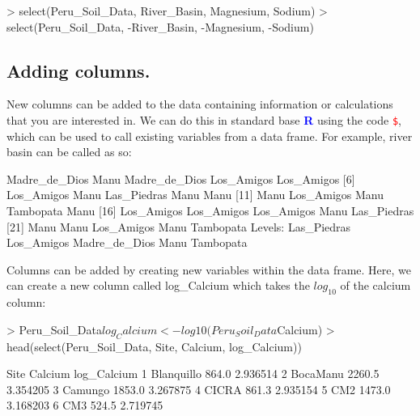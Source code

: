 \documentclass[a4paper,12pt]{article}
\newcommand\boldblue[1]{\textcolor{blue}{\textbf{#1}}}
\newcommand\code[1]{\textcolor{red}{\texttt{#1}}}
\begin{document}
\begin{shaded}
\begin{Schunk}
\begin{Sinput}
> select(Peru_Soil_Data, River_Basin, Magnesium, Sodium)
> select(Peru_Soil_Data, -River_Basin, -Magnesium, -Sodium)
\end{Sinput}
\end{Schunk}
\end{shaded}

\subsection{Adding columns.}

New columns can be added to the data containing information or calculations that you are interested in. We can do this in standard base \boldblue{R} using the code \code{\$}, which can be used to call existing variables from a data frame. For example, river basin can be called as so:

\begin{shaded}
\begin{Schunk}
\begin{Soutput}
 [1] Madre_de_Dios Manu          Madre_de_Dios Los_Amigos    Los_Amigos   
 [6] Los_Amigos    Manu          Las_Piedras   Manu          Manu         
[11] Manu          Los_Amigos    Manu          Tambopata     Manu         
[16] Los_Amigos    Los_Amigos    Los_Amigos    Manu          Las_Piedras  
[21] Manu          Manu          Los_Amigos    Manu          Tambopata    
Levels: Las_Piedras Los_Amigos Madre_de_Dios Manu Tambopata
\end{Soutput}
\end{Schunk}
\end{shaded}

Columns can be added by creating new variables within the data frame. Here, we can create a new column called log\_Calcium which takes the $log_{10}$ of the calcium column:

\begin{shaded}
\begin{Schunk}
\begin{Sinput}
> Peru_Soil_Data$log_Calcium <- log10(Peru_Soil_Data$Calcium)
> head(select(Peru_Soil_Data, Site, Calcium, log_Calcium))
\end{Sinput}
\begin{Soutput}
        Site Calcium log_Calcium
1 Blanquillo   864.0    2.936514
2   BocaManu  2260.5    3.354205
3    Camungo  1853.0    3.267875
4      CICRA   861.3    2.935154
5        CM2  1473.0    3.168203
6        CM3   524.5    2.719745
\end{Soutput}
\end{Schunk}
\end{shaded}
\end{document}
